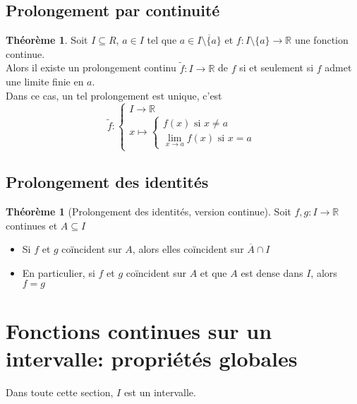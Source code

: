 \documentclass[10pt,a4paper]{article}
\theoremstyle{definition}
\newtheorem{theorem}[proposition]{Théorème}
\begin{document}
\subsection{Prolongement par continuité}
\begin{theorem}
Soit $I \subseteq R$, $a \in I$ tel que $a \in \overline{I \setminus \{ a \}}$ et $f: I \setminus \{ a \} \to \mathbb{R}$ une fonction continue. \\
Alors il existe un prolongement continu $\tilde{f}:I \to \mathbb{R}$ de $f$ si et seulement si $f$ admet une limite finie en $a$. \\
Dans ce cas, un tel prolongement est unique, c'est
\[\tilde{f}:\begin{cases}
I \to \mathbb{R} \\ x \mapsto \begin{cases}
f(x) \text{ si } x \neq a \\ \lim\limits_{x \to a} f(x) \text{ si } x = a
\end{cases}
\end{cases}\]
\end{theorem}

\subsection{Prolongement des identités}
\begin{theorem}[Prolongement des identités, version continue]
Soit $f, g: I \to \mathbb{R}$ continues et $A \subseteq I$
\begin{itemize}
\item Si $f$ et $g$ coïncident sur $A$, alors elles coïncident sur $\overline{A} \cap I$
\item En particulier, si $f$ et $g$ coïncident sur $A$ et que $A$ est dense dans $I$, alors $f = g$
\end{itemize}
\end{theorem}

\section{Fonctions continues sur un intervalle: propriétés globales}
Dans toute cette section, $I$ est un intervalle.
\end{document}
